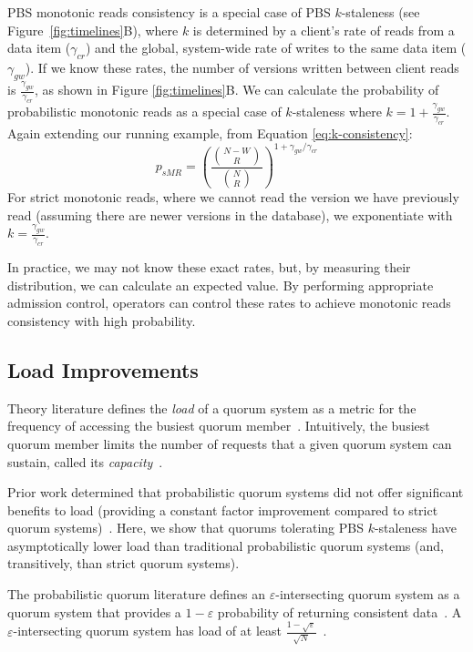 \documentclass{vldb}
\begin{document}
PBS monotonic reads consistency is a special case of PBS $k$-staleness
(see Figure~\ref{fig:timelines}B), where $k$ is determined by a
client's rate of reads from a data item ($\gamma_{cr}$) and the
global, system-wide rate of writes to the same data item
($\gamma_{gw}$).  If we know these rates, the number of
versions written between client reads is
$\frac{\gamma_{gw}}{\gamma_{cr}}$, as shown in Figure
\ref{fig:timelines}B.  We can calculate the probability of
probabilistic monotonic reads as a special case of $k$-staleness where
$k=1+\frac{\gamma_{gw}}{\gamma_{cr}}$.  Again extending our
running example, from Equation \ref{eq:k-consistency}:
\begin{equation}
\label{eq:prob-mr}
p_{sMR} = \left(\frac{{N-W \choose R}}{{N \choose R}}\right)^{1+\gamma_{gw}/\gamma_{cr}}
\end{equation}
For strict monotonic reads, where we cannot read the version we have
previously read (assuming there are newer versions in the database), we
exponentiate with $k=\frac{\gamma_{gw}}{\gamma_{cr}}$.

In practice, we may not know these exact rates, but, by measuring
their distribution, we can calculate an expected value.  By performing
appropriate admission control, operators can control these rates to
achieve monotonic reads consistency with high probability.

\subsection{Load Improvements}

Theory literature defines the \textit{load} of a quorum system as a
metric for the frequency of accessing the busiest quorum
member~\cite[Definition 3.2]{quorumsystems}.  Intuitively, the busiest
quorum member limits the number of requests that a given quorum system
can sustain, called its \textit{capacity}~\cite[Corollary
  3.9]{quorumsystems}.

Prior work determined that probabilistic quorum systems did not offer
significant benefits to load (providing a constant factor improvement
compared to strict quorum systems)~\cite{prob-quorum}.  Here, we show
that quorums tolerating PBS $k$-staleness have asymptotically lower
load than traditional probabilistic quorum systems (and, transitively,
than strict quorum systems).

The probabilistic quorum literature defines an
$\varepsilon$-intersecting quorum system as a quorum system that
provides a $1-\varepsilon$ probability of returning consistent
data~\cite[Definition 3.1]{prob-quorum}.  A $\varepsilon$-intersecting
quorum system has load of at least 
$\frac{1-\sqrt{\varepsilon}}{\sqrt{N}}$~\cite[Corollary
  3.12]{prob-quorum}.
\end{document}

